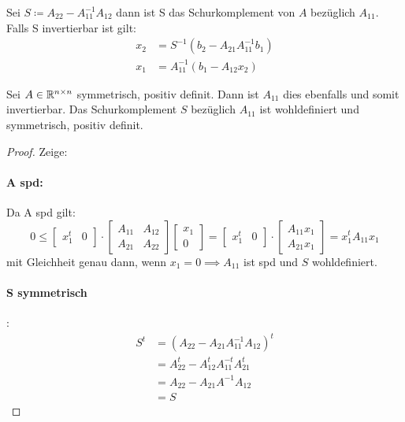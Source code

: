 \begin{definition}
Sei $S \coloneqq A_{22}-A_{11}^{-1}A_{12}$ dann ist S das Schurkomplement von $A$  bezüglich $A_{11}$.
Falls S invertierbar ist gilt:
\begin{align*}
	x_2&= S^{-1}(b_2-A_{21}A_{11}^{-1}b_1) \\
	x_1 &= A_{11}^{-1} (b_1-A_{12}x_2)
\end{align*}
\end{definition}
\begin{lemma}
	Sei $A \in \mathbb{R}^{n\times n}$ symmetrisch, positiv definit. Dann ist $A_{11}$ dies ebenfalls und somit invertierbar. Das Schurkomplement $S$ bezüglich $A_{11}$ ist wohldefiniert und symmetrisch, positiv definit.
\end{lemma}
\begin{proof} Zeige:
\paragraph{A spd:} Da A spd gilt:
\[
0 \le \begin{bmatrix}
	x_1^{t} & 0
\end{bmatrix}
\cdot \begin{bmatrix}
	A_{11} & A_{12} \\
	A_{21} & A_{22}
\end{bmatrix}
\begin{bmatrix}
x_1 \\ 0
\end{bmatrix} = \begin{bmatrix}
x_1^{t} & 0		
\end{bmatrix} \cdot \begin{bmatrix}
A_{11} x_{1} \\ A_{21}x_1
\end{bmatrix}= x_1^{t}A_{11}x_1
\]
mit Gleichheit genau dann, wenn $x_1=0 \implies A_{11}$ ist spd und $S$ wohldefiniert.
\paragraph{S symmetrisch}:
\begin{align*}
	S^{t}&= \left( A_{22}-A_{21}A_{11}^{-1}A_{12} \right)^{t} \\
	     &= A_{22}^{t}-A_{12}^{t}A_{11}^{-t}A_{21}^{t} \\
	     &= A_{22}- A_{21}A^{-1}A_{12} \\
	     &=S
\end{align*}

\end{proof}
